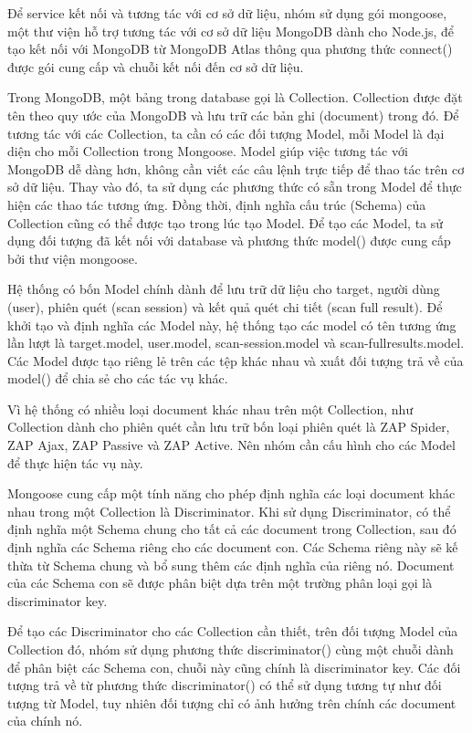 \tab Để service kết nối và tương tác với cơ sở dữ liệu, nhóm sử dụng gói mongoose, một thư viện hỗ trợ tương tác với cơ sở dữ liệu MongoDB dành cho Node.js, để tạo kết nối với MongoDB từ MongoDB Atlas thông qua phương thức connect() được gói cung cấp và chuỗi kết nối đến cơ sở dữ liệu.
\par

Trong MongoDB, một bảng trong database gọi là Collection. Collection được đặt tên theo quy ước của MongoDB và lưu trữ các bản ghi (document) trong đó. Để tương tác với các Collection, ta cần có các đối tượng Model, mỗi Model là đại diện cho mỗi Collection trong Mongoose. Model giúp việc tương tác với MongoDB dễ dàng hơn, không cần viết các câu lệnh trực tiếp để thao tác trên cơ sở dữ liệu. Thay vào đó, ta sử dụng các phương thức có sẵn trong Model để thực hiện các thao tác tương ứng. Đồng thời, định nghĩa cấu trúc (Schema) của Collection cũng có thể được tạo trong lúc tạo Model. Để tạo các Model, ta sử dụng đối tượng đã kết nối với database và phương thức model() được cung cấp bởi thư viện mongoose.
\par

Hệ thống có bốn Model chính dành để lưu trữ dữ liệu cho target, người dùng (user), phiên quét (scan session) và kết quả quét chi tiết (scan full result). Để khởi tạo và định nghĩa các Model này, hệ thống tạo các model có tên tương ứng lần lượt là target.model, user.model, scan-session.model và scan-fullresults.model. Các Model được tạo riêng lẻ trên các tệp khác nhau và xuất đối tượng trả về của model() để chia sẻ cho các tác vụ khác.

Vì hệ thống có nhiều loại document khác nhau trên một Collection, như Collection dành cho phiên quét cần lưu trữ bốn loại phiên quét là ZAP Spider, ZAP Ajax, ZAP Passive và ZAP Active. Nên nhóm cần cấu hình cho các Model để thực hiện tác vụ này.
\par

Mongoose cung cấp một tính năng cho phép định nghĩa các loại document khác nhau trong một Collection là Discriminator. Khi sử dụng Discriminator, có thể định nghĩa một Schema chung cho tất cả các document trong Collection, sau đó định nghĩa các Schema riêng cho các document con. Các Schema riêng này sẽ kế thừa từ Schema chung và bổ sung thêm các định nghĩa của riêng nó. Document của các Schema con sẽ được phân biệt dựa trên một trường phân loại gọi là discriminator key.
\par

Để tạo các Discriminator cho các Collection cần thiết, trên đối tượng Model của Collection đó, nhóm sử dụng phương thức discriminator() cùng một chuỗi dành để phân biệt các Schema con, chuỗi này cũng chính là discriminator key. Các đối tượng trả về từ phương thức discriminator() có thể sử dụng tương tự như đối tượng từ Model, tuy nhiên đối tượng chỉ có ảnh hưởng trên chính các document của chính nó.

